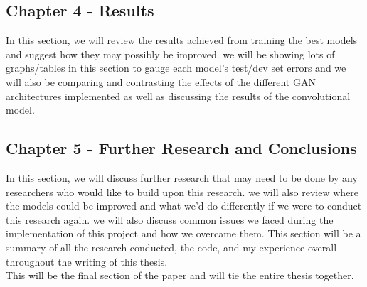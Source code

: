 \subsection{Chapter 4 - Results}
In this section, we will review the results achieved from training the best models and suggest how they may possibly be improved.  we will be showing lots of graphs/tables in this section to gauge each model's test/dev set errors and we will also be comparing and contrasting the effects of the different GAN architectures implemented as well as discussing the results of the convolutional model.
\subsection{Chapter 5 - Further Research and Conclusions}
In this section, we will discuss further research that may need to be done by any researchers who would like to build upon this research.  we will also review where the models could be improved and what we'd do differently if we were to conduct this research again. we will also discuss common issues we faced during the implementation of this project and how we overcame them. This section will be a summary of all the research conducted, the code, and my experience overall throughout the writing of this thesis.  
\\
This will be the final section of the paper and will tie the entire thesis together.  

 
